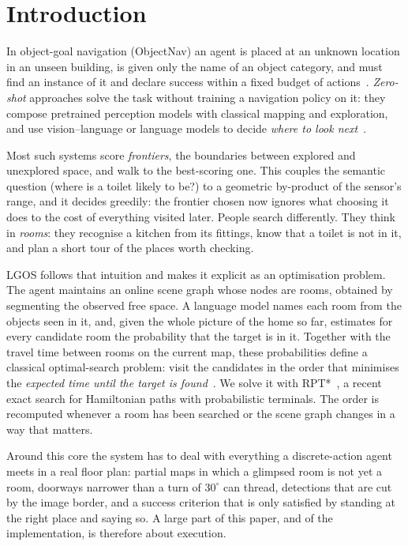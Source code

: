 \documentclass[10pt]{article}
\newcommand{\ours}{LGOS\xspace}
\newcommand{\degree}{^{\circ}}
\begin{document}
\section{Introduction}\label{sec:intro}

In object-goal navigation (ObjectNav) an agent is placed at an unknown location
in an unseen building, is given only the name of an object category, and must
find an instance of it and declare success within a fixed budget of
actions~\citep{anderson2018evaluation,batra2020objectnav}. \emph{Zero-shot}
approaches solve the task without training a navigation policy on it: they
compose pretrained perception models with classical mapping and exploration,
and use vision--language or language models to decide \emph{where to look
next}~\citep{gadre2023cows,zhou2023esc,yu2023l3mvn,yokoyama2024vlfm,yin2024sg}.

Most such systems score \emph{frontiers}, the boundaries between explored and
unexplored space, and walk to the best-scoring one. This couples the semantic
question (where is a toilet likely to be?) to a geometric by-product of the
sensor's range, and it decides greedily: the frontier chosen now ignores what
choosing it does to the cost of everything visited later. People search
differently. They think in \emph{rooms}: they recognise a kitchen from its
fittings, know that a toilet is not in it, and plan a short tour of the places
worth checking.

\ours follows that intuition and makes it explicit as an optimisation problem.
The agent maintains an online scene graph whose nodes are rooms, obtained by
segmenting the observed free space. A language model names each room from the
objects seen in it, and, given the whole picture of the home so far, estimates
for every candidate room the probability that the target is in it. Together
with the travel time between rooms on the current map, these
probabilities define a classical optimal-search problem: visit the candidates
in the order that minimises the \emph{expected time until the target is
found}~\citep{stone1975theory,blum1994minimum}. We solve it with
RPT*~\citep{lyu2026rpt}, a recent exact search for Hamiltonian paths with
probabilistic terminals. The order is recomputed whenever a room has been
searched or the scene graph changes in a way that matters.

Around this core the system has to deal with everything a discrete-action
agent meets in a real floor plan: partial maps in which a glimpsed room is not
yet a room, doorways narrower than a turn of $30\degree$ can thread, detections
that are cut by the image border, and a success criterion that is only
satisfied by standing at the right place and saying so. A large part of this
paper, and of the implementation, is therefore about execution.
\end{document}
